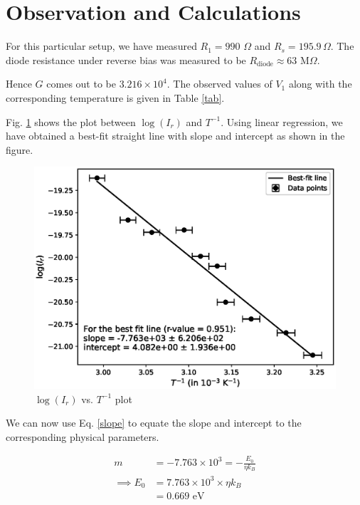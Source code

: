 \section{Observation and Calculations}

For this particular setup, we have measured $R_1 = 990$ $\Omega$ and $R_s = 195.9\,\Omega$. The diode resistance under reverse bias was measured to be $R_\text{diode} \approx 63$ M$\Omega$.

Hence $G$ comes out to be $3.216 \times 10^4$. The observed values of $V_1$ along with the corresponding temperature is given in Table \ref{tab}.



Fig. \ref{g} shows the plot between $\log(I_r)$ and $T^{-1}$. Using linear regression, we have obtained a best-fit straight line with slope and intercept as shown in the figure.

\begin{figure}
    \centering
    \includegraphics[width=1\columnwidth]{images/plot.eps}
    \caption{$\log(I_r)$ vs. $T^{-1}$ plot}
    \label{g}
\end{figure}

We can now use Eq. \ref{slope} to equate the slope and intercept to the corresponding physical parameters.

\begin{align*}
    m &= -7.763 \times 10^3 = -\frac{E_0}{\eta k_B}\\
    \implies E_0 &= 7.763 \times 10^3 \times \eta k_B\\
    &= 0.669 \text{ eV}
\end{align*}

